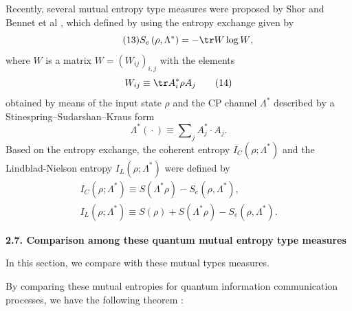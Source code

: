Recently, several mutual entropy type measures were proposed by Shor \cite{nv:-Sho} and Bennet et al \cite{nv:-BNS,nv:-BSST}, which defined by using the entropy
exchange \cite{nv:-Schu} given by%
\begin{equation}
\tag{13}
S_{e}\left( {\rho, \Lambda ^{\ast }}\right) =-\tr W\log W\hbox{,}
\end{equation}%
where  $  W $   is a matrix  $  W=\left( {W_{ij}}\right) _{i,j} $   with the elements 
\begin{equation}
W_{ij}\equiv \tr A_{i}^{\ast }\rho A_{j}
\tag{14}
\end{equation}%
obtained by means of the input state  $  \rho  $   and the CP channel  $  \Lambda
^{\ast } $   described by a Stinespring--Sudarshan--Kraus form 
\begin{equation}
\Lambda ^{\ast }\left({} \cdot {}\right) \equiv \sum\nolimits_{j}A_{j}^{\ast
}\cdot A_{j}.
\tag{15}
\end{equation}%
Based on the entropy exchange, the coherent entropy  $  I_{C}\left( {\rho
;\Lambda ^{\ast }}\right)  $   \cite{nv:-SN} and the Lindblad-Nielson entropy  $  %
I_{L}\left( {\rho ;\Lambda ^{\ast }}\right)  $   \cite{nv:-BSST} were defined by%
\begin{gather}
I_{C}\left( {\rho ;\Lambda ^{\ast }}\right) \equiv S\left( {\Lambda ^{\ast
}\rho }\right)-S_{e}\left( {\rho, \Lambda ^{\ast }}\right), 
\tag{16}
\\
I_{L}\left( {\rho ;\Lambda ^{\ast }}\right) \equiv S( \rho)
+S\left( {\Lambda ^{\ast }\rho }\right)-S_{e}\left( {\rho, \Lambda ^{\ast }}%
\right).
\tag{17}
\end{gather}

\smallskip

\textbf{2.7. Comparison among these quantum mutual entropy type measures}

In this section, we compare with these mutual types measures.

By comparing these mutual entropies for quantum information communication
processes, we have the following theorem \cite{nv:-OW4}:


